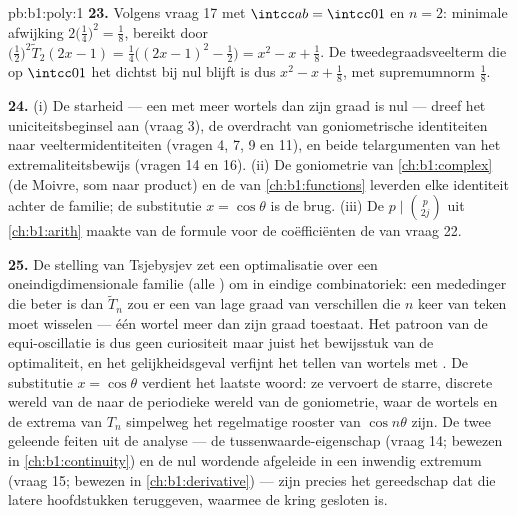 \begin{solution}{pb:b1:poly:1}
\textbf{23.} Volgens vraag 17 met $\intcc ab = \intcc01$ en $n = 2$:
minimale afwijking $2\bigl(\frac14\bigr)^2 = \frac18$, bereikt door
$\bigl(\frac12\bigr)^2\widetilde T_2(2x - 1) = \frac14\bigl((2x-1)^2 -
\frac12\bigr) = x^2 - x + \frac18$. De  tweedegraadsveelterm die
op $\intcc01$ het dichtst bij nul blijft is dus $x^2 - x + \frac18$, met
supremumnorm $\frac18$.

\textbf{24.} (i) De starheid --- een  met meer wortels dan zijn
graad is nul --- dreef het uniciteitsbeginsel aan (vraag 3), de overdracht
van goniometrische identiteiten naar veeltermidentiteiten (vragen 4, 7, 9
en 11), en beide telargumenten van het extremaliteitsbewijs (vragen 14 en
16). (ii) De goniometrie van \cref{ch:b1:complex} (de Moivre, som naar
product) en de  van \cref{ch:b1:functions} leverden
elke identiteit achter de familie; de substitutie $x = \cos\theta$ is de
brug. (iii) De  $p \mid \binom p{2j}$ uit \cref{ch:b1:arith}
maakte van de formule voor de coëfficiënten de  van vraag 22.

\textbf{25.} De stelling van Tsjebysjev zet een optimalisatie over een
oneindigdimensionale familie (alle ) om in eindige
combinatoriek: een mededinger die beter is dan $\widetilde T_n$ zou er een
 van lage graad van verschillen die $n$ keer van teken moet
wisselen --- één wortel meer dan zijn graad toestaat. Het patroon van de
equi-oscillatie is dus geen curiositeit maar juist het bewijsstuk van de
optimaliteit, en het gelijkheidsgeval verfijnt het tellen van wortels met
. De substitutie $x = \cos\theta$ verdient het laatste
woord: ze vervoert de starre, discrete wereld van de  naar de
periodieke wereld van de goniometrie, waar de wortels en de extrema van
$T_n$ simpelweg het regelmatige rooster van $\cos n\theta$ zijn. De twee
geleende feiten uit de analyse --- de tussenwaarde-eigenschap (vraag 14;
bewezen in \cref{ch:b1:continuity}) en de nul wordende afgeleide in een
inwendig extremum (vraag 15; bewezen in \cref{ch:b1:derivative}) --- zijn
precies het gereedschap dat die latere hoofdstukken teruggeven, waarmee de
kring gesloten is.
\end{solution}
